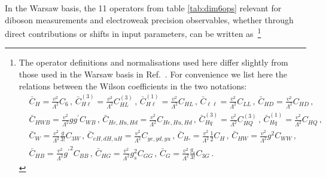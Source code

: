 \documentclass[../report.tex]{subfiles}
\begin{document}
In the Warsaw basis, the 11 operators from table \ref{tab:dim6ops} relevant for diboson measurements and electroweak precision observables, 
whether through direct contributions or shifts in input parameters, can be written as~\footnote{The operator definitions and normalisations used here differ slightly from those used in the Warsaw basis in Ref.~\cite{Ellis:2018gqa}. For convenience we list here the relations between the Wilson coefficients in the two notations:
%
\begin{align*}
&\bar{C}_H = \frac{v^2}{\Lambda^2}C_6  \, , \,  \bar{C}_{H\ell}^{(3)} = \frac{v^2}{\Lambda^2} C_{HL}^{(3)}  \, , \, \bar{C}_{H\ell}^{(1)} = \frac{v^2}{\Lambda^2} C_{HL}  \, , \,  \bar{C}_{\ell\ell} = \frac{v^2}{\Lambda^2} C_{LL}  \, , \,  \bar{C}_{HD} = \frac{v^2}{\Lambda^2} C_{HD}  \, , \, \\ 
& \bar{C}_{HWB} = \frac{v^2}{\Lambda^2} g g^\prime C_{WB}  \, , \,  \bar{C}_{He,Hu,Hd} = \frac{v^2}{\Lambda^2} C_{He,Hu,Hd}  \, , \,  \bar{C}_{Hq}^{(3)} = \frac{v^2}{\Lambda^2} C_{HQ}^{(3)} \, , \, \bar{C}_{Hq}^{(1)} = \frac{v^2}{\Lambda^2} C_{HQ}  \, , \,  \\
& \bar{C}_W = \frac{v^2}{\Lambda^2} \frac{g}{3!} C_{3W} \, , \,  \bar{C}_{eH, dH, uH} = \frac{v^2}{\Lambda^2} C_{ye, yd, yu}  \, , \, \bar{C}_{H\square} = \frac{v^2}{\Lambda^2}  \frac{1}{2} C_H \, , \,  \bar{C}_{HW} = \frac{v^2}{\Lambda^2} g^2 C_{WW}  \, , \, \\
& \bar{C}_{HB} = \frac{v^2}{\Lambda^2} {g^\prime}^2 C_{BB}  \, , \, \bar{C}_{HG} = \frac{v^2}{\Lambda^2} g_s^2 C_{GG}  \, , \,  \bar{C}_G = \frac{v^2}{\Lambda^2} \frac{g_s}{3!} C_{3G}  \, .
\end{align*}
}  
%
\end{document}
